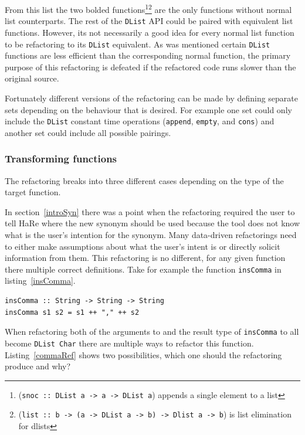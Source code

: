 From this list the two bolded functions\footnote{(\texttt{snoc :: DList a -> a -> DList a}) appends a single element to a list}\footnote{(\texttt{list :: b -> (a -> DList a -> b) -> Dlist a -> b}) is list elimination for dlists} are the only functions without normal list counterparts. The rest of the \texttt{DList} API could be paired with equivalent list functions. However, its not necessarily a good idea for every normal list function to be refactoring to its \texttt{DList} equivalent. As was mentioned certain \texttt{DList} functions are less efficient than the corresponding normal function, the primary purpose of this refactoring is defeated if the refactored code runs slower than the original source.

Fortunately different versions of the refactoring can be made by defining separate sets depending on the behaviour that is desired. For example one set could only include the \texttt{DList} constant time operations (\texttt{append}, \texttt{empty}, and \texttt{cons}) and another set could include all possible pairings. 

\subsubsection{Transforming functions}

The refactoring breaks into three different cases depending on the type of the target function. 

In section~\ref{introSyn} there was a point when the refactoring required the user to tell HaRe where the new synonym should be used because the tool does not know what is the user's intention for the synonym. Many data-driven refactorings need to either make assumptions about what the user's intent is or directly solicit information from them. This refactoring is no different, for any given function there multiple correct definitions. Take for example the function \texttt{insComma} in listing~\ref{insComma}.

\begin{lstlisting}[label=insComma,caption={\texttt{insComma}}]
insComma :: String -> String -> String
insComma s1 s2 = s1 ++ "," ++ s2
\end{lstlisting}  

When refactoring both of the arguments to and the result type of \texttt{insComma} to all become \texttt{DList Char} there are multiple ways to refactor this function. Listing~\ref{commaRef} shows two possibilities, which one should the refactoring produce and why?

